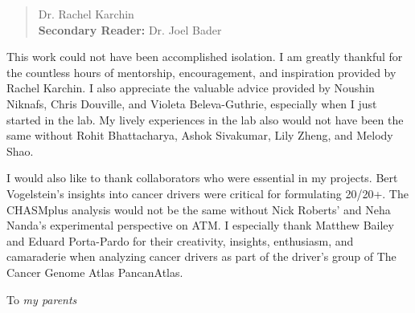 \begin{frontmatter}
\begin{abstract}
\vfill
{} Dr. Rachel Karchin \\
{\bf{Secondary Reader:}} Dr. Joel Bader
\end{abstract}

\begin{acknowledgment}

This work could not have been accomplished isolation. I am greatly thankful for the countless hours of mentorship, encouragement, and inspiration provided by Rachel Karchin. I also appreciate the valuable advice provided by Noushin Niknafs, Chris Douville, and Violeta Beleva-Guthrie, especially when I just started in the lab. My lively experiences in the lab also would not have been the same without Rohit Bhattacharya, Ashok Sivakumar, Lily Zheng, and Melody Shao.

I would also like to thank collaborators who were essential in my projects. Bert Vogelstein's insights into cancer drivers were critical for formulating 20/20+. The CHASMplus analysis would not be the same without Nick Roberts' and Neha Nanda's experimental perspective on ATM. I especially thank Matthew Bailey and Eduard Porta-Pardo for their creativity, insights, enthusiasm, and camaraderie when analyzing cancer drivers as part of the driver's group of The Cancer Genome Atlas PancanAtlas.

\end{acknowledgment}

\begin{dedication}
 
To \textit{my parents}

\end{dedication}

\tableofcontents

\listoftables

\listoffigures

\end{frontmatter}
